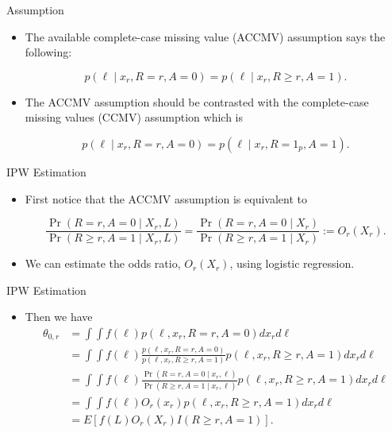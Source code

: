 \documentclass{beamer} %
\begin{document}
\begin{frame}{Assumption}
  \begin{itemize}
    \item The available complete-case missing value (ACCMV) assumption says the
      following:

      \[p(\ell \mid x_r, R = r, A = 0) = p(\ell \mid x_r, R \geq r, A = 1).\]

      \pause

    \item The ACCMV assumption should be contrasted with the complete-case
      missing values (CCMV) assumption \cite{tchetgen2018discrete} which is 

      \[p(\ell \mid x_r, R = r, A = 0) = p(\ell \mid x_r, R = 1_p, A = 1).\]
  \end{itemize}
\end{frame}

\begin{frame}{IPW Estimation}
  \begin{itemize}
    \item First notice that the ACCMV assumption is equivalent to

      \[
        \frac{\Pr(R = r, A = 0 \mid X_r, L)}{\Pr(R \geq r, A = 1 \mid X_r, L)} = 
        \frac{\Pr(R = r, A = 0 \mid X_r)}{\Pr(R \geq r, A = 1 \mid X_r)} := O_r(X_r).
      \]
    \item We can estimate the odds ratio, $O_r(X_r)$, using logistic regression.
  \end{itemize}
\end{frame}

\begin{frame}{IPW Estimation}
  \begin{itemize}
    \item Then we have
      \begin{align*}
        \theta_{0, r} 
        &= \int \int f(\ell) p(\ell, x_r, R = r, A = 0) dx_r d\ell \\
        &= \int \int f(\ell) \frac{p(\ell, x_r, R = r, A = 0)}{p(\ell, x_r, R
        \geq r, A = 1)} p(\ell, x_r, R \geq r, A = 1) dx_r d\ell \\
        &= \int \int f(\ell) \frac{\Pr(R = r, A = 0 \mid x_r, \ell)}{\Pr(R \geq
        r, A = 1 \mid x_r, \ell)} p(\ell, x_r, R \geq r, A = 1) dx_r d\ell \\
        &= \int \int f(\ell) O_r(x_r) p(\ell, x_r, R \geq r, A = 1) dx_r d\ell \\
        &= E[f(L)O_r(X_r)I(R \geq r, A = 1)].
      \end{align*}
  \end{itemize}
\end{frame}
\end{document}
